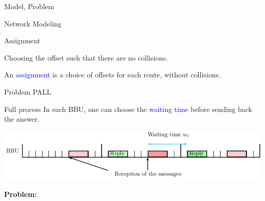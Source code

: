 \documentclass[10 pt]{beamer}
\begin{document}
\begin{section}{Model, Problem}
\begin{subsection}{Network Modeling}
\begin{frame}{Assignment }
\begin{center}
{
}
\end{center}
\vspace{1cm}
\centering
Choosing the offset such that there are no collisions.
\vspace{0.5cm}

An \textcolor{blue}{assignment} is a choice of offsets for each route, without collisions.
\end{frame}
\end{subsection}



\begin{subsection}{Problem PALL}
\begin{frame}{Full process}
In each BBU, one can choose the \textcolor{blue}{waiting time} before sending back the answer.\\

\begin{center}
  \includegraphics[scale=0.7]{BBU}\\
 \end{center} 

\textbf{Problem:}


\end{frame}
\end{subsection}
\end{section}
\end{document}
